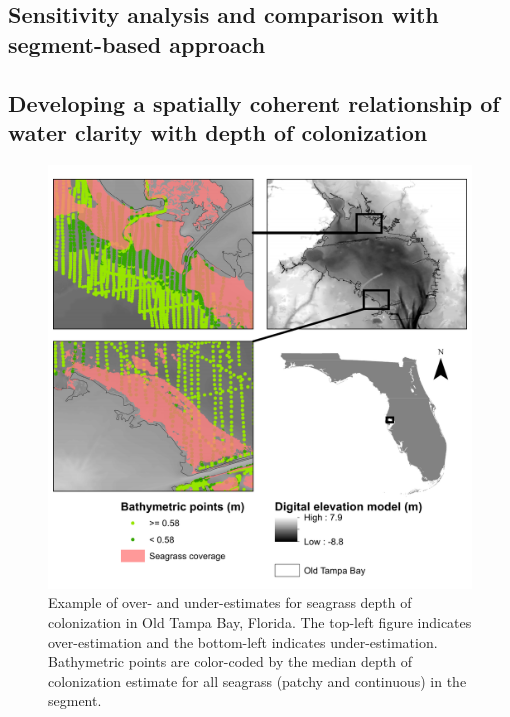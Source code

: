 \documentclass[letterpaper,12pt]{article}\usepackage[]{graphicx}\usepackage[]{color}
\begin{document}
\subsection{Sensitivity analysis and comparison with segment-based approach}

\subsection{Developing a spatially coherent relationship of water clarity with depth of colonization}

\clearpage

\begin{figure}
\includegraphics[width = \textwidth]{figs/wbid_doc.pdf}
\caption{Example of over- and under-estimates for seagrass depth of colonization in Old Tampa Bay, Florida.  The top-left figure indicates over-estimation and the bottom-left indicates under-estimation.  Bathymetric points are color-coded by the median depth of colonization estimate for all seagrass (patchy and continuous) in the segment.}
\label{fig:wbid_doc}
\end{figure}
\end{document}
